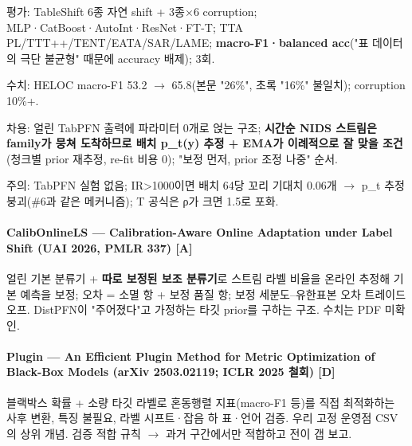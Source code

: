 \par\noindent \textbullet\enspace 평가: TableShift 6종 자연 shift +\allowbreak{} 3종×6 corruption; MLP·CatBoost·AutoInt·ResNet·FT-T; TTA PL/\allowbreak{}TTT+\allowbreak{}+\allowbreak{}/\allowbreak{}TENT/\allowbreak{}EATA/\allowbreak{}SAR/\allowbreak{}LAME; \textbf{macro-F1·balanced acc}("표 데이터의 극단 불균형" 때문에 accuracy 배제); 3회.


\par\noindent \textbullet\enspace 수치: HELOC macro-F1 53.2 \ensuremath{\rightarrow} 65.8(본문 "26\%", 초록 "16\%" 불일치); corruption 10\%+\allowbreak{}.


\par\noindent \textbullet\enspace 차용: 얼린 TabPFN 출력에 파라미터 0개로 얹는 구조; \textbf{시간순 NIDS 스트림은 family가 뭉쳐 도착하므로 배치 p\_\allowbreak{}t(y) 추정 +\allowbreak{} EMA가 이례적으로 잘 맞을 조건}(청크별 prior 재추정, re-fit 비용 0); "보정 먼저, prior 조정 나중" 순서.


\par\noindent \textbullet\enspace 주의: TabPFN 실험 없음; IR>1000이면 배치 64당 꼬리 기대치 0.06개  \ensuremath{\rightarrow}  p\_\allowbreak{}t 추정 붕괴(\#6과 같은 메커니즘); T 공식은 ρ가 크면 1.5로 포화.


\paragraph{CalibOnlineLS — Calibration-Aware Online Adaptation under Label Shift (UAI 2026, PMLR 337) [A]}
\par\noindent \textbullet\enspace 얼린 기본 분류기 +\allowbreak{} \textbf{따로 보정된 보조 분류기}로 스트림 라벨 비율을 온라인 추정해 기본 예측을 보정; 오차 =\allowbreak{} 소멸 항 +\allowbreak{} 보정 품질 항; 보정 세분도–유한표본 오차 트레이드오프. DistPFN이 "주어졌다"고 가정하는 타깃 prior를 구하는 구조. 수치는 PDF 미확인.


\paragraph{Plugin — An Efficient Plugin Method for Metric Optimization of Black-Box Models (arXiv 2503.02119; ICLR 2025 철회) [D]}
\par\noindent \textbullet\enspace 블랙박스 확률 +\allowbreak{} 소량 타깃 라벨로 혼동행렬 지표(macro-F1 등)를 직접 최적화하는 사후 변환, 특징 불필요, 라벨 시프트·잡음 하 표·언어 검증. 우리 고정 운영점 CSV의 상위 개념. 검증 적합 규칙  \ensuremath{\rightarrow}  과거 구간에서만 적합하고 전이 갭 보고.


